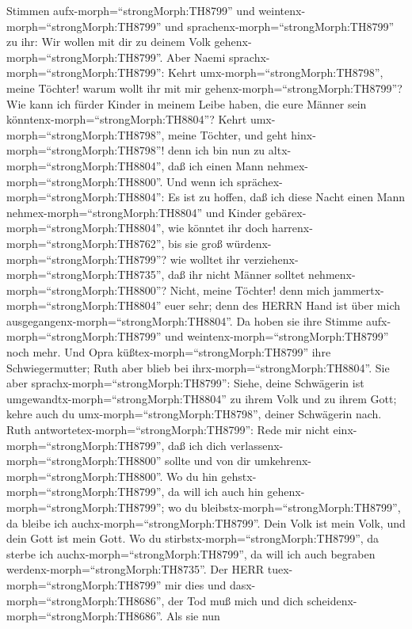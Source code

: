 Stimmen aufx-morph=``strongMorph:TH8799'' und
weintenx-morph=``strongMorph:TH8799''  und
sprachenx-morph=``strongMorph:TH8799'' zu ihr: Wir wollen mit dir zu
deinem Volk gehenx-morph=``strongMorph:TH8799''.  Aber
Naemi sprachx-morph=``strongMorph:TH8799'': Kehrt
umx-morph=``strongMorph:TH8798'', meine Töchter! warum wollt ihr mit mir
gehenx-morph=``strongMorph:TH8799''? Wie kann ich fürder Kinder in
meinem Leibe haben, die eure Männer sein
könntenx-morph=``strongMorph:TH8804''?  Kehrt
umx-morph=``strongMorph:TH8798'', meine Töchter, und geht
hinx-morph=``strongMorph:TH8798''! denn ich bin nun zu
altx-morph=``strongMorph:TH8804'', daß ich einen Mann
nehmex-morph=``strongMorph:TH8800''. Und wenn ich
sprächex-morph=``strongMorph:TH8804'': Es ist zu hoffen, daß ich diese
Nacht einen Mann nehmex-morph=``strongMorph:TH8804'' und Kinder
gebärex-morph=``strongMorph:TH8804'',  wie könntet ihr doch
harrenx-morph=``strongMorph:TH8762'', bis sie groß
würdenx-morph=``strongMorph:TH8799''? wie wolltet ihr
verziehenx-morph=``strongMorph:TH8735'', daß ihr nicht Männer solltet
nehmenx-morph=``strongMorph:TH8800''? Nicht, meine Töchter! denn mich
jammertx-morph=``strongMorph:TH8804'' euer sehr; denn des HERRN Hand ist
über mich ausgegangenx-morph=``strongMorph:TH8804''.  Da
hoben sie ihre Stimme aufx-morph=``strongMorph:TH8799'' und
weintenx-morph=``strongMorph:TH8799'' noch mehr. Und Opra
küßtex-morph=``strongMorph:TH8799'' ihre Schwiegermutter; Ruth aber
blieb bei ihrx-morph=``strongMorph:TH8804''.  Sie aber
sprachx-morph=``strongMorph:TH8799'': Siehe, deine Schwägerin ist
umgewandtx-morph=``strongMorph:TH8804'' zu ihrem Volk und zu ihrem Gott;
kehre auch du umx-morph=``strongMorph:TH8798'', deiner Schwägerin nach.
 Ruth antwortetex-morph=``strongMorph:TH8799'': Rede mir
nicht einx-morph=``strongMorph:TH8799'', daß ich dich
verlassenx-morph=``strongMorph:TH8800'' sollte und von dir
umkehrenx-morph=``strongMorph:TH8800''. Wo du hin
gehstx-morph=``strongMorph:TH8799'', da will ich auch hin
gehenx-morph=``strongMorph:TH8799''; wo du
bleibstx-morph=``strongMorph:TH8799'', da bleibe ich
auchx-morph=``strongMorph:TH8799''. Dein Volk ist mein Volk, und dein
Gott ist mein Gott.  Wo du
stirbstx-morph=``strongMorph:TH8799'', da sterbe ich
auchx-morph=``strongMorph:TH8799'', da will ich auch begraben
werdenx-morph=``strongMorph:TH8735''. Der HERR
tuex-morph=``strongMorph:TH8799'' mir dies und
dasx-morph=``strongMorph:TH8686'', der Tod muß mich und dich
scheidenx-morph=``strongMorph:TH8686''.  Als sie nun

